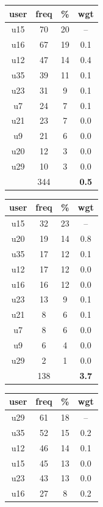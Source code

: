 \begin{table}
\centering
\begin{tabular}{ |c|c|c|c| }
	\hline
	\textbf{user} & \textbf{freq} & \textbf{\%} & \textbf{wgt} \\
	\hline
	u15 & 70 & 20 & -- \\
	u16 & 67 & 19 & 0.1 \\
	u12 & 47 & 14 & 0.4 \\
	u35 & 39 & 11 & 0.1 \\
	u23 & 31 & 9 & 0.1 \\
	u7 & 24 & 7 & 0.1 \\
	u21 & 23 & 7 & 0.0 \\
	u9 & 21 & 6 & 0.0 \\
	u20 & 12 & 3 & 0.0 \\
	u29 & 10 & 3 & 0.0 \\
	 & 344 & & \textbf{0.5} \\
	\hline
\end{tabular}
\begin{tabular}{ |c|c|c|c| }
	\hline
	\textbf{user} & \textbf{freq} & \textbf{\%} & \textbf{wgt} \\
	\hline
	u15 & 32 & 23 & -- \\
	u20 & 19 & 14 & 0.8 \\
	u35 & 17 & 12 & 0.1 \\
	u12 & 17 & 12 & 0.0 \\
	u16 & 16 & 12 & 0.0 \\
	u23 & 13 & 9 & 0.1 \\
	u21 & 8 & 6 & 0.1 \\
	u7 & 8 & 6 & 0.0 \\
	u9 & 6 & 4 & 0.0 \\
	u29 & 2 & 1 & 0.0 \\
	 & 138 & & \textbf{3.7} \\
	\hline
\end{tabular}
\begin{tabular}{ |c|c|c|c| }
	\hline
	\textbf{user} & \textbf{freq} & \textbf{\%} & \textbf{wgt} \\
	\hline
	u29 & 61 & 18 & -- \\
	u35 & 52 & 15 & 0.2 \\
	u12 & 46 & 14 & 0.1 \\
	u15 & 45 & 13 & 0.0 \\
	u23 & 43 & 13 & 0.0 \\
	u16 & 27 & 8 & 0.2 \\

\end{tabular}
\end{table}
